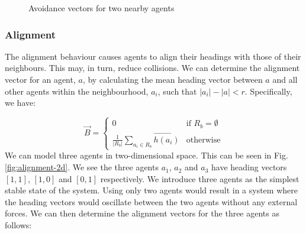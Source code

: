 \documentclass[12pt]{article}
\begin{document}
\begin{figure}[ht]
    \centering
    \caption{Avoidance vectors for two nearby agents}
    \label{fig:avoidance-2d}
\end{figure}

\subsubsection{Alignment}
The alignment behaviour causes agents to align their headings with those of their neighbours. This may, in turn, reduce collisions. We can determine the alignment vector for an agent, $a$, by calculating the mean heading vector between $a$ and all other agents within the neighbourhood, $a_i$, such that $|a_i| - |a| < r$. Specifically, we have:

\begin{equation}
\vec{B} =
\begin{cases}
    0 & \text{if } R_b = \emptyset \\
    \frac{1}{|R_b|} \sum_{a_i \in R_b} \vec{h(a_i)} & \text{otherwise}
\end{cases}
\end{equation}
We can model three agents in two-dimensional space. This can be seen in Fig. \ref{fig:alignment-2d}. We see the three agents $a_1$, $a_2$ and $a_3$ have heading vectors $[1,1]$, $[1,0]$ and $[0,1]$ respectively. We introduce three agents as the simplest stable state of the system. Using only two agents would result in a system where the heading vectors would oscillate between the two agents without any external forces. We can then determine the alignment vectors for the three agents as follows:
\end{document}
